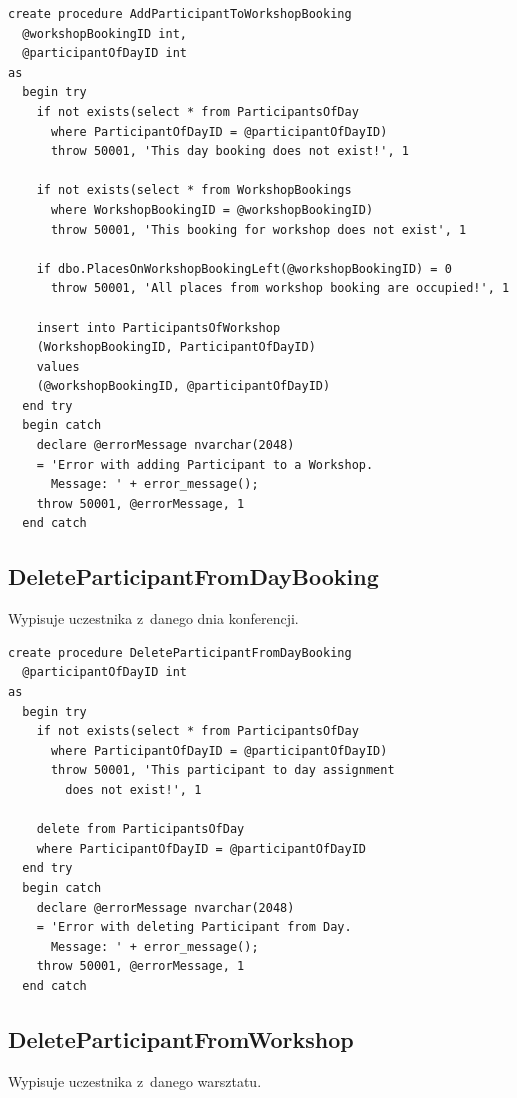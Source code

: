 \documentclass[12pt, a4paper]{mwrep}
\begin{document}
\begin{lstlisting}
create procedure AddParticipantToWorkshopBooking
  @workshopBookingID int,
  @participantOfDayID int
as
  begin try
    if not exists(select * from ParticipantsOfDay 
      where ParticipantOfDayID = @participantOfDayID)
      throw 50001, 'This day booking does not exist!', 1

    if not exists(select * from WorkshopBookings 
      where WorkshopBookingID = @workshopBookingID)
      throw 50001, 'This booking for workshop does not exist', 1

    if dbo.PlacesOnWorkshopBookingLeft(@workshopBookingID) = 0
      throw 50001, 'All places from workshop booking are occupied!', 1

    insert into ParticipantsOfWorkshop
    (WorkshopBookingID, ParticipantOfDayID)
    values
    (@workshopBookingID, @participantOfDayID)
  end try
  begin catch
    declare @errorMessage nvarchar(2048)
    = 'Error with adding Participant to a Workshop. 
      Message: ' + error_message();
    throw 50001, @errorMessage, 1
  end catch
\end{lstlisting}

\subsection{DeleteParticipantFromDayBooking}

\noindent Wypisuje uczestnika z~danego dnia konferencji.

\begin{lstlisting}
create procedure DeleteParticipantFromDayBooking
  @participantOfDayID int
as
  begin try
    if not exists(select * from ParticipantsOfDay 
      where ParticipantOfDayID = @participantOfDayID)
      throw 50001, 'This participant to day assignment 
        does not exist!', 1

    delete from ParticipantsOfDay
    where ParticipantOfDayID = @participantOfDayID
  end try
  begin catch
    declare @errorMessage nvarchar(2048)
    = 'Error with deleting Participant from Day. 
      Message: ' + error_message();
    throw 50001, @errorMessage, 1
  end catch
\end{lstlisting}

\subsection{DeleteParticipantFromWorkshop}

\noindent Wypisuje uczestnika z~danego warsztatu.
\end{document}
